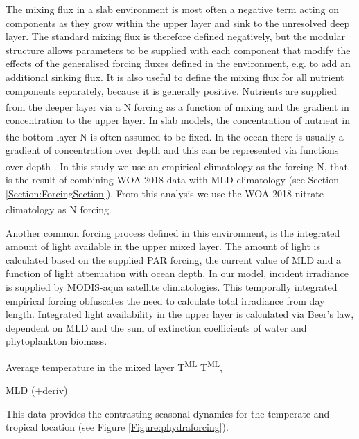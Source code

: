 \documentclass[template.tex]{subfiles}
\begin{document}
The mixing flux in a slab environment is most often a negative term acting on components as they grow within the upper layer and sink to the unresolved deep layer. The standard mixing flux is therefore defined negatively, but the modular structure allows parameters to be supplied with each component that modify the effects of the generalised forcing fluxes defined in the environment, e.g. to add an additional sinking flux. It is also useful to define the mixing flux for all nutrient components separately, because it is generally positive. Nutrients are supplied from the deeper layer via a \unit{N^\emptyset} forcing as a function of mixing and the gradient in concentration to the upper layer. 
In slab models, the concentration of nutrient in the bottom layer \unit{N^\emptyset} is often assumed to be fixed. In the ocean there is usually a gradient of concentration over depth and this can be represented via functions over depth \citep{Frost1987GrazingSpp., Fasham1995VariationsAnalysis}. In this study we use an empirical climatology as the forcing \unit{N^\emptyset}, that is the result of combining WOA 2018 data with MLD climatology (see Section \ref{Section:ForcingSection}). From this analysis we use the WOA 2018 nitrate climatology as \unit{N^\emptyset} forcing.

Another common forcing process defined in this environment, is the integrated amount of light available in the upper mixed layer. The amount of light is calculated based on the supplied PAR forcing, the current value of MLD and a function of light attenuation with ocean depth. In our model, incident irradiance is supplied by MODIS-aqua satellite climatologies. This temporally integrated empirical forcing obfuscates the need to calculate total irradiance from day length. Integrated light availability in the upper layer is calculated via Beer's law, dependent on MLD and the sum of extinction coefficients of water and phytoplankton biomass. 


Average temperature in the mixed layer \unit{T^{ML}}
\unit{T^{ML}},

MLD (+deriv)

This data provides the contrasting seasonal dynamics for the temperate and tropical location (see Figure \ref{Figure:phydraforcing}).
\end{document}
